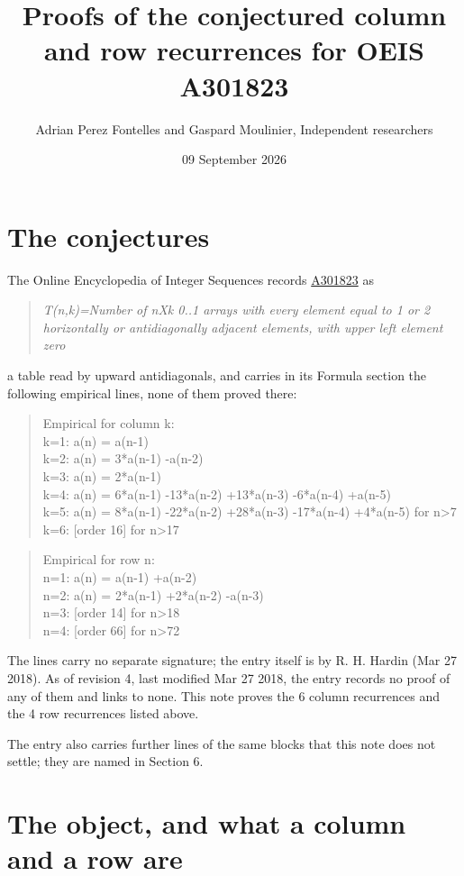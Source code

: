 \documentclass[11pt]{article}
\title{Proofs of the conjectured column and row recurrences for OEIS A301823}
\author{Adrian Perez Fontelles and Gaspard Moulinier, Independent researchers}
\date{09 September 2026}
\theoremstyle{definition}
\begin{document}
\maketitle
\section{The conjectures}

The Online Encyclopedia of Integer Sequences records \href{https://oeis.org/A301823}{A301823} as

\begin{quote}\itshape T(n,k)=Number of nXk 0..1 arrays with every element equal to 1 or 2 horizontally or antidiagonally adjacent elements, with upper left element zero\end{quote}

a table read by upward antidiagonals, and carries in its Formula section the following empirical lines, none of them proved there:

\begin{quote}\ttfamily Empirical for column k:\\
k=1: a(n) = a(n-1)\\k=2: a(n) = 3*a(n-1) -a(n-2)\\k=3: a(n) = 2*a(n-1)\\k=4: a(n) = 6*a(n-1) -13*a(n-2) +13*a(n-3) -6*a(n-4) +a(n-5)\\k=5: a(n) = 8*a(n-1) -22*a(n-2) +28*a(n-3) -17*a(n-4) +4*a(n-5) for n>7\\k=6: [order 16] for n>17\end{quote}

\begin{quote}\ttfamily Empirical for row n:\\
n=1: a(n) = a(n-1) +a(n-2)\\n=2: a(n) = 2*a(n-1) +2*a(n-2) -a(n-3)\\n=3: [order 14] for n>18\\n=4: [order 66] for n>72\end{quote}

The lines carry no separate signature; the entry itself is by R. H. Hardin (Mar 27 2018). As of revision 4, last modified Mar 27 2018, the entry records no proof of any of them and links to none. This note proves the 6 column recurrences and the 4 row recurrences listed above.

The entry also carries further lines of the same blocks that this note does not settle; they are named in Section 6.

\section{The object, and what a column and a row are}
\end{document}
